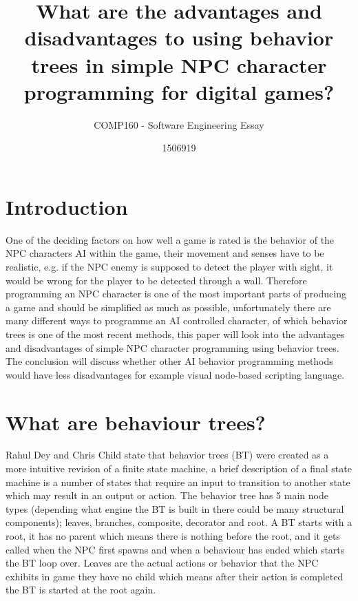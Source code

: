 \documentclass{scrartcl}
\title{What are the advantages and disadvantages to using behavior trees in simple NPC character programming for digital games?}
\subtitle{COMP160 - Software Engineering Essay}
\author{1506919}
\begin{document}
\maketitle


\section{Introduction}

One of the deciding factors on how well a game is rated is the behavior of the NPC characters AI within the game, their movement and senses have to be realistic\cite{dey2013ql}, e.g. if the NPC enemy is supposed to detect the player with sight, it would be wrong for the player to be detected through a wall. Therefore programming an NPC character is one of the most important parts of producing a game\cite{buckland2005programming} and should be simplified as much as possible, unfortunately there are many different ways to programme an AI controlled character, of which behavior trees is one of the most recent methods\cite{GDCVault}, this paper will look into the advantages and disadvantages of simple NPC character programming using behavior trees. The conclusion will discuss whether other AI behavior programming methods would have less disadvantages for example visual node-based scripting language.

\section{What are behaviour trees?}

Rahul Dey and Chris Child state that behavior trees (BT) were created as a more intuitive revision of a finite state machine\cite{dey2013ql}, a brief description of a final state machine is a number of states that require an input to transition to another state which may result in an output or action\cite{buckland2005programming}. The behavior tree has 5 main node types\cite{gamasutra} (depending what engine the BT is built in there could be many structural components); leaves, branches, composite, decorator and root.
A BT starts with a root, it has no parent which means there is nothing before the root, and it gets called when the NPC first spawns and when a behaviour has ended which starts the BT loop over.
Leaves are the actual actions or behavior that the NPC exhibits in game they have no child which means after their action is completed the BT is started at the root again\cite{marzinotto2014towards}.
\end{document}
